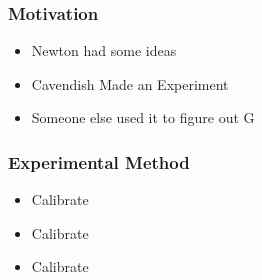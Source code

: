 \documentclass{beamer}
\begin{document}
\begin{frame}
\frametitle[Gravitational Constant]{Motivation}

   \begin{itemize}
   \item  Newton had some ideas
   \item  Cavendish Made an Experiment 
   \item  Someone else used it to figure out G
   \end{itemize}
\end{frame}


\begin{frame}
\frametitle[Gravitational Constant]{Experimental Method}

   \begin{itemize}
   \item  Calibrate
   \item  Calibrate
   \item  Calibrate
   \end{itemize}
\end{frame}
\end{document}
